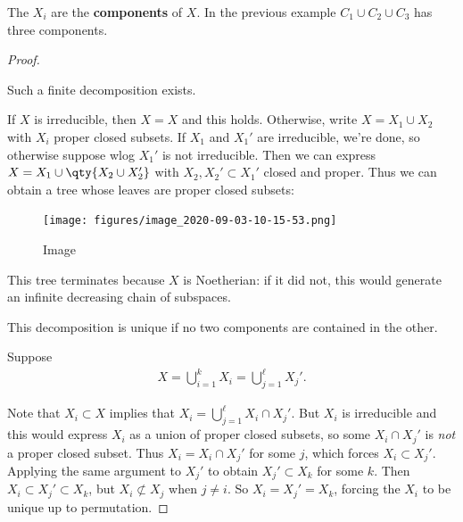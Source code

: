 \begin{remark}

The \(X_i\) are the \textbf{components} of \(X\). In the previous
example \(C_1 \cup C_2 \cup C_3\) has three components.

\end{remark}

\begin{proof}

\begin{claim}

Such a finite decomposition exists.

\end{claim}

If \(X\) is irreducible, then \(X=X\) and this holds. Otherwise, write
\(X = X_1 \cup X_2\) with \(X_i\) proper closed subsets. If \(X_1\) and
\(X_1'\) are irreducible, we're done, so otherwise suppose wlog \(X_1'\)
is not irreducible. Then we can express
\(X = X_1 \cup\qty{X_2 \cup X_2'}\) with \(X_2, X_2' \subset X_1'\)
closed and proper. Thus we can obtain a tree whose leaves are proper
closed subsets:

\begin{figure}
\centering
\texttt{[image: figures/image\_2020-09-03-10-15-53.png]}
\caption{Image}
\end{figure}

This tree terminates because \(X\) is Noetherian: if it did not, this
would generate an infinite decreasing chain of subspaces.

\begin{claim}

This decomposition is unique if no two components are contained in the
other.

\end{claim}

Suppose
\begin{align*}  
X= \bigcup_{i=1}^k X_i = \bigcup_{j=1}^\ell X_j'
.\end{align*}

Note that \(X_i \subset X\) implies that
\(X_i = \bigcup_{j=1}^\ell X_i \cap X_j'\). But \(X_i\) is irreducible
and this would express \(X_i\) as a union of proper closed subsets, so
some \(X_i \cap X_j'\) is \emph{not} a proper closed subset. Thus
\(X_i = X_i \cap X_j'\) for some \(j\), which forces
\(X_i \subset X_j'\). Applying the same argument to \(X_j'\) to obtain
\(X_j' \subset X_k\) for some \(k\). Then
\(X_i \subset X_j' \subset X_k\), but \(X_ i \not\subset X_j\) when
\(j\neq i\). So \(X_i = X_j' = X_k\), forcing the \(X_i\) to be unique
up to permutation.

\end{proof}

